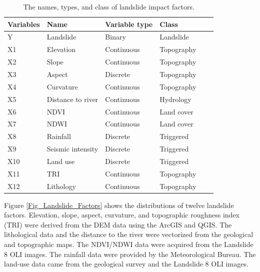 \documentclass[a4paper,fleqn]{cas-sc}
\begin{document}
\begin{table}
  \centering
  \caption{The names, types, and class of landslide impact factors.} 
  \begin{tabular}{llllll}
    \toprule
    \textbf{Variables} & \textbf{Name}  & \textbf{Variable type} & \textbf{Class} \\
    \midrule
    Y     & Landslide  & Binary & Landslide \\
    X1    & Elevation  & Continuous & Topography \\
    X2    & Slope  & Continuous & Topography \\
    X3    & Aspect  & Discrete & Topography \\
    X4   & Curvature  & Continuous & Topography \\
    X5   & Distance to river  & Continuous  & Hydrology \\
    X6   & NDVI   & Continuous & Land cover  \\
    X7   & NDWI   & Continuous & Land cover \\
    X8   & Rainfall  & Discrete & Triggered  \\
    X9   & Seismic intensity  & Discrete & Triggered  \\
    X10   & Land use  & Discrete & Triggered  \\
    X11   & TRI  & Continuous & Topography  \\
    X12   & Lithology  & Continuous & Topography  \\
    \bottomrule
    \end{tabular}%
  \label{tab_factors}%
\end{table}%

Figure \ref{Fig_Landslide_Factors} shows the distributions of twelve landslide factors. 
Elevation, slope, aspect, curvature, and topographic roughness index (TRI) were derived from the DEM data using the ArcGIS and QGIS. 
The lithological data and the distance to the river were vectorized from the geological and topographic maps. 
The NDVI/NDWI data were acquired from the Landslide 8 OLI images. 
The rainfall data were provided by the Meteorological Bureau. 
The land-use data came from the geological survey and the Landslide 8 OLI images.
\end{document}
